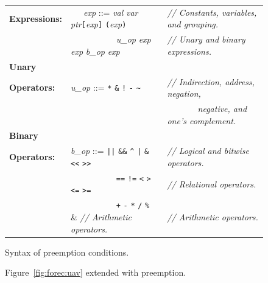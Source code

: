 \begin{figure}
	\centering
	\footnotesize
	\def\arraystretch{1.3}
	
	\begin{tabular}{| l l l|}
		\hline
		\textbf{Expressions:}	& ~~~\emph{exp}  ::= \emph{val} \textbar{} \emph{var} \textbar{} \emph{ptr}\verb$[$\emph{exp}\verb$]$ \textbar{} \verb$($\emph{exp}\verb$)$ 					& \emph{// Constants, variables, and grouping.}	\\
								&			~~~~~~~~~~\textbar{} \emph{u\_op} \emph{exp} \textbar{} \emph{exp} \emph{b\_op} \emph{exp}															& \emph{// Unary and binary expressions.}		\\
		\textbf{Unary}			&																																								&												\\
		\textbf{Operators:}		& \emph{u\_op}	 ::= \verb$*$ \textbar{} \verb$&$ \textbar{} \verb$!$ \textbar{} \verb$-$ \textbar{} \verb$~$										 			& \emph{// Indirection, address, negation,}		\\
								&																																								& \emph{~~~~~~~negative, and one's complement.}	\\
		\textbf{Binary}			&																																								&												\\
		\textbf{Operators:}		& \emph{b\_op}	 ::= \verb$||$ \textbar{} \verb$&&$ \textbar{} \verb$^$ \textbar{} \verb$|$ \textbar{} \verb$&$ \textbar{} \verb$<<$ \textbar{} \verb$>>$ 		& \emph{// Logical and bitwise operators.}		\\
								&			~~~~~~~~~~\textbar{} \verb$==$ \textbar{} \verb$!=$ \textbar{} \verb$<$ \textbar{} \verb$>$ \textbar{} \verb$<=$ \textbar{} \verb$>=$				& \emph{// Relational operators.}				\\
								&			~~~~~~~~~~\textbar{} \verb$+$ \textbar{} \verb$-$ \textbar{} \verb$*$ \textbar{} \verb$/$ \textbar{} \verb$%$										& \emph{// Arithmetic operators.}				\\
		\hline
	\end{tabular}
	
	\caption{Syntax of preemption conditions.}
	\label{fig:forec:abort_expressions}
\end{figure}

\begin{figure}
	\centering

	\begin{minipage}[t]{0.67\columnwidth}
		
	\end{minipage}

	\caption{Figure~\ref{fig:forec:uav} extended with preemption.}
	\label{fig:forec:uav_abort}
\end{figure}

